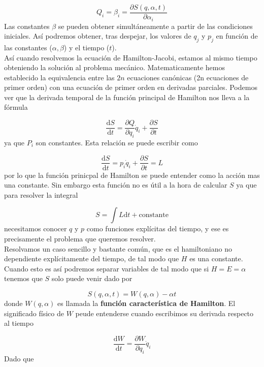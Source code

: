 \documentclass[12pt,a4paper]{article}
\numberwithin{equation}{section}
\numberwithin{figure}{section}
\newcommand{\parciales}[2]{\frac{\partial #1}{\partial #2}}
\newcommand{\D}{\mathrm{d}}
\newcommand{\derivadas}[2]{\frac{\D #1}{\D #2}}
\begin{document}
\begin{equation}
Q_i = \beta_i = \parciales{S(q,\alpha,t)}{\alpha_i}
\end{equation}
Las constantes $\beta$ se pueden obtener simultáneamente a partir de las condiciones iniciales. Así podremos obtener, tras despejar, los valores de $q_j$ y $p_j$ en función de las constantes ($\alpha,\beta$) y el tiempo ($t$). \\

Así cuando resolvemos la ecuación de Hamilton-Jacobi, estamos al mismo tiempo obteniendo la solución al problema mecánico. Matematicamente hemos establecido la equivalencia entre las $2n$ ecuaciones canónicas (2n ecuaciones de primer orden) con una ecuación de primer orden en derivadas parciales. Podemos ver que la derivada temporal de la función principal de Hamilton nos lleva a la fórmula

$$ \derivadas{S}{t} = \parciales{Q}{q_i} \dot{q}_i + \parciales{S}{t} $$
ya que $P_i$ son constantes. Esta relación se puede escribir como

\begin{equation}
\derivadas{S}{t} = p_i \dot{q}_i + \parciales{S}{t} = L
\end{equation}
por lo que la función prinicpal de Hamilton se puede entender como la acción mas una constante. Sin embargo esta función no es útil a la hora de calcular $S$ ya que para resolver la integral

\begin{equation}
S = \int L \D t + \text{constante}
\end{equation}
necesitamos conocer $q$ y $p$ como funciones explícitas del tiempo, y ese es precisamente el problema que queremos resolver. \\

Resolvamos un caso sencillo y bastante común, que es el hamiltoniano no dependiente explícitamente del tiempo, de tal modo que $H$ es una constante. Cuando esto es así podremos separar variables de tal modo que si $H=E=\alpha$ tenemos que $S$ solo puede venir dado por

\begin{equation}
S ( q,\alpha,t) = W(q,\alpha) - \alpha t
\end{equation}
donde $W(q,\alpha)$ es llamada la \textbf{función característica de Hamilton}. El significado físico de $W$ peude entenderse cuando escribimos su derivada respecto al tiempo

\begin{equation}
\derivadas{W}{t} = \parciales{W}{q_i} \dot{q}_i
\end{equation}
Dado que 
\end{document}

